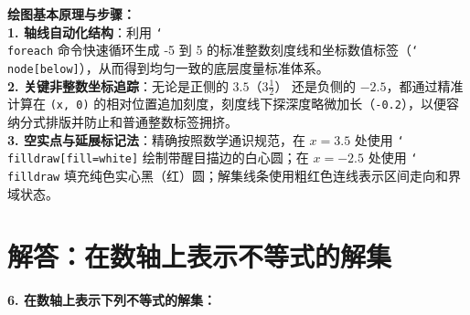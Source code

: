 {\small\color{blue!70!black}
\textbf{绘图基本原理与步骤：}\\
\textbf{1. 轴线自动化结构}：利用 \texttt{\char`\\foreach} 命令快速循环生成 -5 到 5 的标准整数刻度线和坐标数值标签（\texttt{\char`\\node[below]}），从而得到均匀一致的底层度量标准体系。\\
\textbf{2. 关键非整数坐标追踪}：无论是正侧的 $3.5$（$3\frac{1}{2}$） 还是负侧的 $-2.5$，都通过精准计算在 \texttt{(x, 0)} 的相对位置追加刻度，刻度线下探深度略微加长（\texttt{-0.2}），以便容纳分式排版并防止和普通整数标签拥挤。\\
\textbf{3. 空实点与延展标记法}：精确按照数学通识规范，在 $x=3.5$ 处使用 \texttt{\char`\\filldraw[fill=white]} 绘制带醒目描边的白心圆；在 $x=-2.5$ 处使用 \texttt{\char`\\filldraw} 填充纯色实心黑（红）圆；解集线条使用粗红色连线表示区间走向和界域状态。
}

\newpage



\newpage

\section{解答：在数轴上表示不等式的解集}

\vspace{0.6cm}

\textbf{6. 在数轴上表示下列不等式的解集：}

\vspace{0.4cm}

